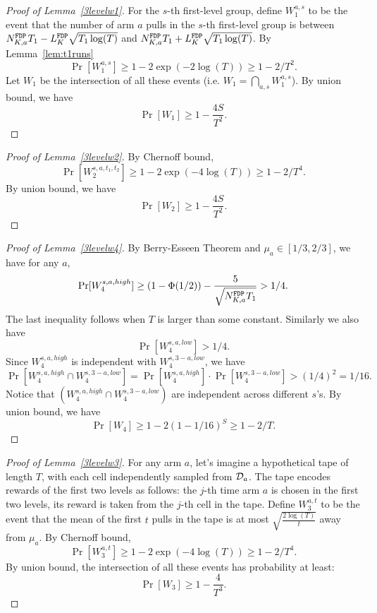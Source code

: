 \begin{proof}[Proof of Lemma~\ref{3levelw1}]
  For the $s$-th first-level group, define $W_1^{a,s}$ to be the event
  that the number of arm $a$ pulls in the $s$-th first-level group is
  between $N^\mathtt{FDP}_{K,a} T_1- L^\mathtt{FDP}_K \sqrt{T_1\log(T)}$ and
  $N^\mathtt{FDP}_{K,a} T_1 + L^\mathtt{FDP}_K \sqrt{T_1\log(T)}$. By Lemma~\ref{lem:t1runs}
\[
\Pr[W_1^{a,s}] \geq 1-2\exp(-2\log(T)) \geq 1-2/T^2.
\]
Let $W_1$  be the intersection of all these events (i.e.
$W_1 = \bigcap_{a,s}W_1^{a,s}$). By union bound, we have
\[
\Pr[W_1] \geq 1- \frac{4S}{T^2}.
\]
\end{proof}



\begin{proof}[Proof of Lemma~\ref{3levelw2}]
  By Chernoff bound,
\[
\Pr[W_2^{s,a,t_1,t_2}] \geq 1 - 2\exp(-4\log(T)) \geq 1- 2/T^4.
\]
By union bound, we have
\[
\Pr[W_2] \geq 1- \frac{4S}{T^2}.
\]
\end{proof}


\begin{proof}[Proof of Lemma~\ref{3levelw4}]
By Berry-Esseen Theorem and
  $\mu_a \in [1/3,2/3]$, we have for any $a$,
\[
\Pr[W_4^{s,a,high}] \geq (1-\Phi(1/2)) - \frac{5}{\sqrt{N^\mathtt{FDP}_{K,a} T_1}} > 1/4.
\]
The last inequality follows when $T$ is larger than some constant.
Similarly we also have
\[
\Pr[W_4^{s,a,low}] > 1/4.
\]
Since $W_4^{s,a,high}$ is independent with $W_4^{s,3-a,low}$, we have
\[
\Pr[W_4^{s,a,high} \cap W_4^{s,3-a,low}] =\Pr[W_4^{s,a,high}] \cdot  \Pr[W_4^{s,3-a,low}]>(1/4)^2 = 1/16.
\]
Notice that $(W_4^{s,a,high} \cap W_4^{s,3-a,low})$ are independent
across different $s$'s. By union bound, we have
\[
\Pr[W_4] \geq 1- 2(1-1/16)^S \geq 1 -2 /T.
\]
\end{proof}



\begin{proof}[Proof of Lemma~\ref{3levelw3}]
  For any arm $a$, let's imagine a hypothetical tape of length $T$,
  with each cell independently sampled from $\mathcal{D}_a$. The tape encodes
  rewards of the first two levels as follows: the $j$-th time arm $a$
  is chosen in the first two levels, its reward is taken from the
  $j$-th cell in the tape. Define $W_3^{a,t}$ to be the event that the
  mean of the first $t$ pulls in the tape is at most
  $\sqrt{\frac{2\log(T)}{t}}$ away from $\mu_a$. By Chernoff bound,
\[
\Pr[W_3^{a,t}] \geq 1 - 2\exp(-4\log(T)) \geq 1- 2/T^4.
\]
By union bound, the intersection of all these events has probability
at least:
\[
\Pr[W_3] \geq 1- \frac{4}{T^3}.
\]
\end{proof}

